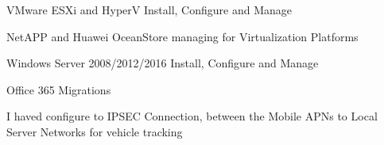 \begin{cventries}
{\begin{cvitems}
        \item {VMware ESXi and HyperV Install, Configure and Manage}
        \item {NetAPP and Huawei OceanStore managing for Virtualization Platforms}
        \item {Windows Server 2008/2012/2016 Install, Configure and Manage}
        \item {Office 365 Migrations}
        \item {I haved configure to IPSEC Connection, between the Mobile APNs to Local Server Networks for vehicle tracking}
      \end{cvitems} 
    }
\end{cventries}